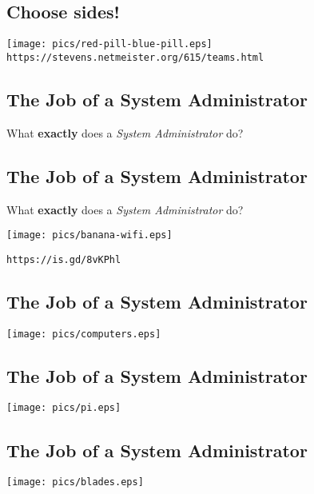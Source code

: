 \documentclass[xga]{xdvislides}
\begin{document}
\subsection{Choose sides!}
\vspace*{\fill}
\begin{center}
	\texttt{[image: pics/red-pill-blue-pill.eps]} \\
	\verb+https://stevens.netmeister.org/615/teams.html+
\end{center}
\vspace*{\fill}

\subsection{The Job of a System Administrator}
What {\bf exactly} does a {\em System Administrator} do?

\subsection{The Job of a System Administrator}
What {\bf exactly} does a {\em System Administrator} do?
\vspace*{\fill}
\begin{center}
	\texttt{[image: pics/banana-wifi.eps]} \\
\end{center}
\vspace*{\fill}
{\tt https://is.gd/8vKPhl}

\subsection{The Job of a System Administrator}
\begin{center}
	\texttt{[image: pics/computers.eps]} \\
\end{center}

\subsection{The Job of a System Administrator}
\vspace*{\fill}
\begin{center}
	\texttt{[image: pics/pi.eps]} \\
\end{center}
\vspace*{\fill}

\subsection{The Job of a System Administrator}
\vspace*{\fill}
\begin{center}
	\texttt{[image: pics/blades.eps]} \\
\end{center}
\vspace*{\fill}
\end{document}
